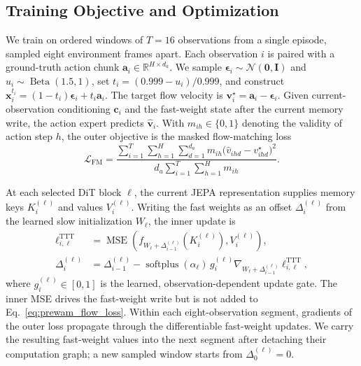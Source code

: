 \subsection{Training Objective and Optimization}
\label{sec:prewam_training}

We train on ordered windows of $T=16$ observations from a single episode, sampled eight environment frames apart. Each observation $i$ is paired with a ground-truth action chunk $\mathbf{a}_i\in\mathbb{R}^{H\times d_a}$. We sample $\boldsymbol{\epsilon}_i\sim\mathcal{N}(\mathbf{0},\mathbf{I})$ and $u_i\sim\operatorname{Beta}(1.5,1)$, set $t_i=(0.999-u_i)/0.999$, and construct $\mathbf{x}_i^{t_i}=(1-t_i)\boldsymbol{\epsilon}_i+t_i\mathbf{a}_i$. The target flow velocity is $\mathbf{v}_i^\star=\mathbf{a}_i-\boldsymbol{\epsilon}_i$. Given current-observation conditioning $\mathbf{c}_i$ and the fast-weight state after the current memory write, the action expert predicts $\hat{\mathbf{v}}_i$. With $m_{ih}\in\{0,1\}$ denoting the validity of action step $h$, the outer objective is the masked flow-matching loss
\begin{equation}
\mathcal{L}_{\mathrm{FM}}=
\frac{\sum_{i=1}^{T}\sum_{h=1}^{H}\sum_{d=1}^{d_a}
    m_{ih}\bigl(\hat v_{ihd}-v^\star_{ihd}\bigr)^2}
     {d_a\sum_{i=1}^{T}\sum_{h=1}^{H}m_{ih}}.
\label{eq:prewam_flow_loss}
\end{equation}

At each selected DiT block $\ell$, the current JEPA representation supplies memory keys $K_i^{(\ell)}$ and values $V_i^{(\ell)}$. Writing the fast weights as an offset $\Delta_i^{(\ell)}$ from the learned slow initialization $W_\ell$, the inner update is
\begin{equation}
\begin{aligned}
\ell_{i,\ell}^{\mathrm{TTT}}
    &=\operatorname{MSE}\!\left(
       f_{W_\ell+\Delta_{i-1}^{(\ell)}}(K_i^{(\ell)}),
       V_i^{(\ell)}\right),\\
\Delta_i^{(\ell)}
    &=\Delta_{i-1}^{(\ell)}
      -\operatorname{softplus}(\alpha_\ell)\,g_i^{(\ell)}
       \nabla_{W_\ell+\Delta_{i-1}^{(\ell)}}
       \ell_{i,\ell}^{\mathrm{TTT}},
\end{aligned}
\label{eq:prewam_inner_update}
\end{equation}
where $g_i^{(\ell)}\in[0,1]$ is the learned, observation-dependent update gate. The inner MSE drives the fast-weight write but is not added to Eq.~\eqref{eq:prewam_flow_loss}. Within each eight-observation segment, gradients of the outer loss propagate through the differentiable fast-weight updates. We carry the resulting fast-weight values into the next segment after detaching their computation graph; a new sampled window starts from $\Delta_0^{(\ell)}=0$.

